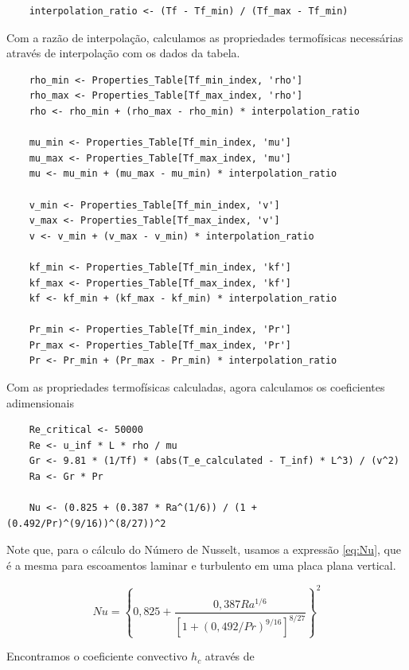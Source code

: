 \documentclass[12pt]{scrartcl}
\begin{document}
\begin{lstlisting}
    interpolation_ratio <- (Tf - Tf_min) / (Tf_max - Tf_min)
\end{lstlisting}

Com a razão de interpolação, calculamos as propriedades termofísicas necessárias através de interpolação 
com os dados da tabela.

\begin{lstlisting}
    rho_min <- Properties_Table[Tf_min_index, 'rho']
    rho_max <- Properties_Table[Tf_max_index, 'rho']
    rho <- rho_min + (rho_max - rho_min) * interpolation_ratio
    
    mu_min <- Properties_Table[Tf_min_index, 'mu']
    mu_max <- Properties_Table[Tf_max_index, 'mu']
    mu <- mu_min + (mu_max - mu_min) * interpolation_ratio
    
    v_min <- Properties_Table[Tf_min_index, 'v']
    v_max <- Properties_Table[Tf_max_index, 'v']
    v <- v_min + (v_max - v_min) * interpolation_ratio
    
    kf_min <- Properties_Table[Tf_min_index, 'kf']
    kf_max <- Properties_Table[Tf_max_index, 'kf']
    kf <- kf_min + (kf_max - kf_min) * interpolation_ratio
    
    Pr_min <- Properties_Table[Tf_min_index, 'Pr']
    Pr_max <- Properties_Table[Tf_max_index, 'Pr']
    Pr <- Pr_min + (Pr_max - Pr_min) * interpolation_ratio
\end{lstlisting}

Com as propriedades termofísicas calculadas, agora calculamos os coeficientes
adimensionais

\begin{lstlisting}
    Re_critical <- 50000
    Re <- u_inf * L * rho / mu
    Gr <- 9.81 * (1/Tf) * (abs(T_e_calculated - T_inf) * L^3) / (v^2)
    Ra <- Gr * Pr

    Nu <- (0.825 + (0.387 * Ra^(1/6)) / (1 + (0.492/Pr)^(9/16))^(8/27))^2
\end{lstlisting}

Note que, para o cálculo do Número de Nusselt, usamos a expressão \eqref{eq:Nu}, que 
é a mesma para escoamentos laminar e turbulento em uma placa plana vertical.

\begin{equation}\label{eq:Nu}
    Nu = \left\{ 0,825 + \frac{0,387Ra^{1/6}}{\left[1 + \left(0,492 / Pr\right)^{9/16}\right]^{8/27}} \right\}^2
\end{equation}

Encontramos o coeficiente convectivo $h_c$ através de 
\end{document}
